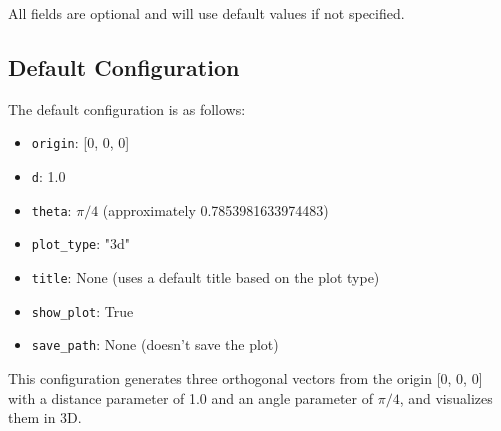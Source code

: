 All fields are optional and will use default values if not specified.

\subsection{Default Configuration}

The default configuration is as follows:

\begin{itemize}
    \item \texttt{origin}: [0, 0, 0]
    \item \texttt{d}: 1.0
    \item \texttt{theta}: $\pi/4$ (approximately 0.7853981633974483)
    \item \texttt{plot\_type}: "3d"
    \item \texttt{title}: None (uses a default title based on the plot type)
    \item \texttt{show\_plot}: True
    \item \texttt{save\_path}: None (doesn't save the plot)
\end{itemize}

This configuration generates three orthogonal vectors from the origin [0, 0, 0] with a distance parameter of 1.0 and an angle parameter of $\pi/4$, and visualizes them in 3D.
